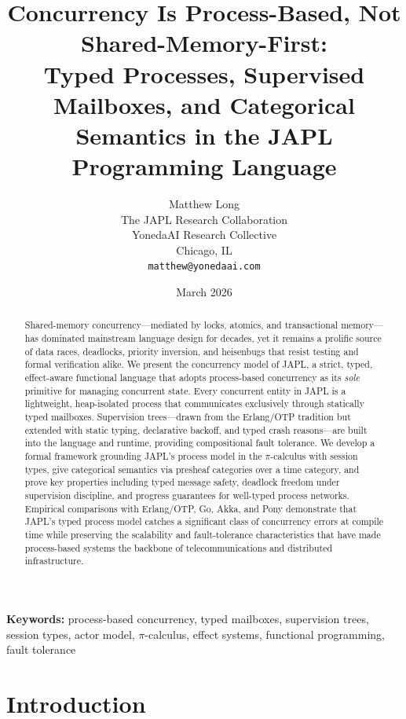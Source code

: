 \documentclass[11pt,a4paper]{article}
\title{\textbf{Concurrency Is Process-Based, Not Shared-Memory-First:}\\[6pt]
\Large Typed Processes, Supervised Mailboxes, and Categorical\\
Semantics in the JAPL Programming Language}
\author{Matthew Long\\
The JAPL Research Collaboration\\
YonedaAI Research Collective\\
Chicago, IL\\
\texttt{matthew@yonedaai.com}}
\date{March 2026}
\begin{document}
\maketitle

\begin{abstract}
Shared-memory concurrency---mediated by locks, atomics, and transactional memory---has dominated mainstream language design for decades, yet it remains a prolific source of data races, deadlocks, priority inversion, and heisenbugs that resist testing and formal verification alike. We present the concurrency model of JAPL, a strict, typed, effect-aware functional language that adopts process-based concurrency as its \emph{sole} primitive for managing concurrent state. Every concurrent entity in JAPL is a lightweight, heap-isolated process that communicates exclusively through statically typed mailboxes. Supervision trees---drawn from the Erlang/OTP tradition but extended with static typing, declarative backoff, and typed crash reasons---are built into the language and runtime, providing compositional fault tolerance. We develop a formal framework grounding JAPL's process model in the $\pi$-calculus with session types, give categorical semantics via presheaf categories over a time category, and prove key properties including typed message safety, deadlock freedom under supervision discipline, and progress guarantees for well-typed process networks. Empirical comparisons with Erlang/OTP, Go, Akka, and Pony demonstrate that JAPL's typed process model catches a significant class of concurrency errors at compile time while preserving the scalability and fault-tolerance characteristics that have made process-based systems the backbone of telecommunications and distributed infrastructure.
\end{abstract}

\vspace{1em}
\noindent\textbf{Keywords:} process-based concurrency, typed mailboxes, supervision trees, session types, actor model, $\pi$-calculus, effect systems, functional programming, fault tolerance

\newpage
\tableofcontents
\newpage

\section{Introduction}\label{sec:intro}
\end{document}
